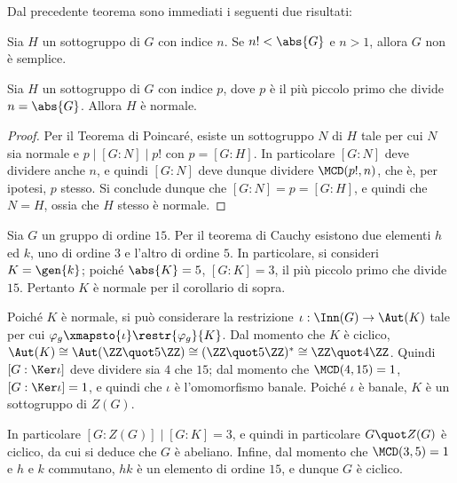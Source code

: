 \documentclass[12pt]{scrartcl}
\begin{document}
	Dal precedente teorema sono immediati i seguenti due risultati:
	
	\begin{corollary}
		Sia $H$ un sottogruppo di $G$ con indice $n$. Se $n! < \abs{G}$ e
		$n>1$, allora $G$ non è semplice.
	\end{corollary}
	
	\begin{corollary}
		Sia $H$ un sottogruppo di $G$ con indice $p$, dove $p$ è il più piccolo
		primo che divide $n = \abs{G}$. Allora $H$ è normale.
	\end{corollary}
	
	\begin{proof}
		Per il Teorema di Poincaré, esiste un sottogruppo $N$ di $H$ tale per cui
		$N$ sia normale e $p \mid [G : N] \mid p!$ con $p = [G : H]$. In particolare
		$[G : N]$ deve dividere anche $n$, e quindi $[G : N]$ deve dunque
		dividere $\MCD(p!, n)$, che è, per ipotesi, $p$ stesso. Si conclude dunque
		che $[G : N] = p = [G : H]$, e quindi che $N = H$, ossia che $H$ stesso
		è normale.
	\end{proof}
	
	\begin{example} 
		Sia $G$ un gruppo di ordine $15$. Per il teorema di Cauchy esistono
		due elementi $h$ ed $k$, uno di ordine $3$ e l'altro di ordine $5$.
		In particolare, si consideri $K = \gen{k}$; poiché $\abs{K} = 5$,
		$[G : K] = 3$, il più piccolo primo che divide $15$. Pertanto
		$K$ è normale per il corollario di sopra. \medskip
		
		
		Poiché $K$ è normale, si può considerare la restrizione $\iota :
		\Inn(G) \to \Aut(K)$ tale per cui $\varphi_g \xmapsto{\iota} \restr{\varphi_g}{K}$.
		Dal momento che $K$ è ciclico, $\Aut(K) \cong \Aut(\ZZ \quot 5 \ZZ) \cong
		(\ZZ \quot 5 \ZZ)^* \cong \ZZ \quot 4 \ZZ$. Quindi $[G : \Ker \iota]$ deve
		dividere sia $4$ che $15$; dal momento che $\MCD(4, 15) = 1$, $[G : \Ker \iota] = 1$,
		e quindi che $\iota$ è l'omomorfismo banale. Poiché $\iota$ è banale, $K$ è
		un sottogruppo di $Z(G)$. \medskip
		
		
		In particolare $[G : Z(G)] \mid [G : K] = 3$, e quindi in particolare
		$G \quot Z(G)$ è ciclico, da cui si deduce che $G$ è abeliano. Infine,
		dal momento che $\MCD(3, 5) = 1$ e $h$ e $k$ commutano,
		$hk$ è un elemento di ordine $15$, e dunque $G$ è ciclico.
	\end{example}
\end{document}
